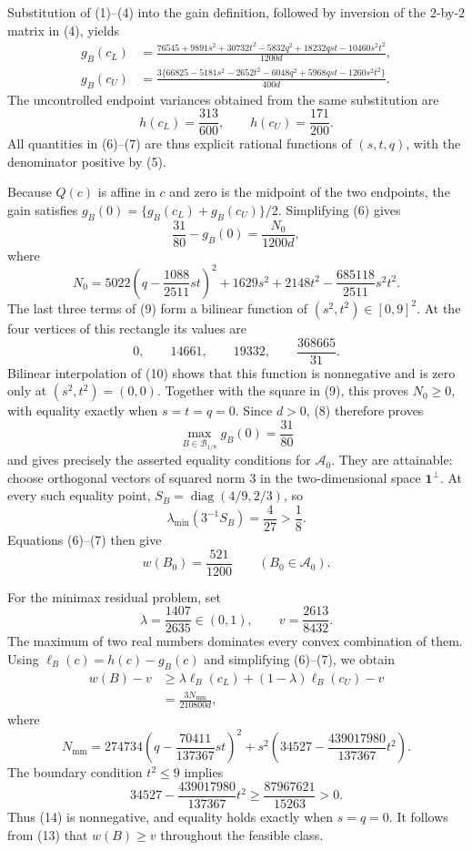 Substitution of (1)--(4) into the gain definition, followed by inversion of
the \(2\)-by-\(2\) matrix in (4), yields
\[
\begin{aligned}
 g_B(c_L)
 &=\frac{76545+9891s^2+30732t^2-5832q^2
          +18232qst-10460s^2t^2}{1200d},\\
 g_B(c_U)
 &=\frac{3\{66825-5181s^2-2652t^2-6048q^2
          +5968qst-1260s^2t^2\}}{400d}.
\end{aligned}
\tag{6}
\]
The uncontrolled endpoint variances obtained from the same substitution are
\[
 h(c_L)=\frac{313}{600},
 \qquad
 h(c_U)=\frac{171}{200}.
\tag{7}
\]
All quantities in (6)--(7) are thus explicit rational functions of
\((s,t,q)\), with the denominator positive by (5).

Because \(Q(c)\) is affine in \(c\) and zero is the midpoint of the two
endpoints, the gain satisfies
\(g_B(0)=\{g_B(c_L)+g_B(c_U)\}/2\).  Simplifying (6) gives
\[
 \frac{31}{80}-g_B(0)=\frac{N_0}{1200d},
 \tag{8}
\]
where
\[
 N_0
 =5022\left(q-\frac{1088}{2511}st\right)^2
  +1629s^2+2148t^2-\frac{685118}{2511}s^2t^2.
 \tag{9}
\]
The last three terms of (9) form a bilinear function of
\((s^2,t^2)\in[0,9]^2\).  At the four vertices of this rectangle its values
are
\[
 0,
 \qquad
 14661,
 \qquad
 19332,
 \qquad
 \frac{368665}{31}.
 \tag{10}
\]
Bilinear interpolation of (10) shows that this function is nonnegative and is
zero only at \((s^2,t^2)=(0,0)\).  Together with the square in (9), this proves
\(N_0\ge0\), with equality exactly when \(s=t=q=0\).  Since \(d>0\), (8)
therefore proves
\[
 \max_{B\in\mathcal B_{1/8}}g_B(0)=\frac{31}{80}
\]
and gives precisely the asserted equality conditions for \(\mathcal A_0\).
They are attainable: choose orthogonal vectors of squared norm \(3\) in the
two-dimensional space \(\mathbf1^{\perp}\).  At every such equality point,
\(S_B=\operatorname{diag}(4/9,2/3)\), so
\[
 \lambda_{\min}(3^{-1}S_B)=\frac4{27}>\frac18.
 \tag{11}
\]
Equations (6)--(7) then give
\[
 w(B_0)=\frac{521}{1200}
 \qquad(B_0\in\mathcal A_0).
 \tag{12}
\]

For the minimax residual problem, set
\[
 \lambda=\frac{1407}{2635}\in(0,1),
 \qquad
 v=\frac{2613}{8432}.
\]
The maximum of two real numbers dominates every convex combination of them.
Using \(\ell_B(c)=h(c)-g_B(c)\) and simplifying (6)--(7), we obtain
\[
\begin{aligned}
 w(B)-v
 &\ge \lambda\ell_B(c_L)+(1-\lambda)\ell_B(c_U)-v\\
 &=\frac{3N_{\mathrm{mm}}}{210800d},
\end{aligned}
\tag{13}
\]
where
\[
 N_{\mathrm{mm}}
 =274734\left(q-\frac{70411}{137367}st\right)^2
  +s^2\left(34527-\frac{439017980}{137367}t^2\right).
 \tag{14}
\]
The boundary condition \(t^2\le9\) implies
\[
 34527-\frac{439017980}{137367}t^2
 \ge \frac{87967621}{15263}>0.
 \tag{15}
\]
Thus (14) is nonnegative, and equality holds exactly when \(s=q=0\).
It follows from (13) that \(w(B)\ge v\) throughout the feasible class.

